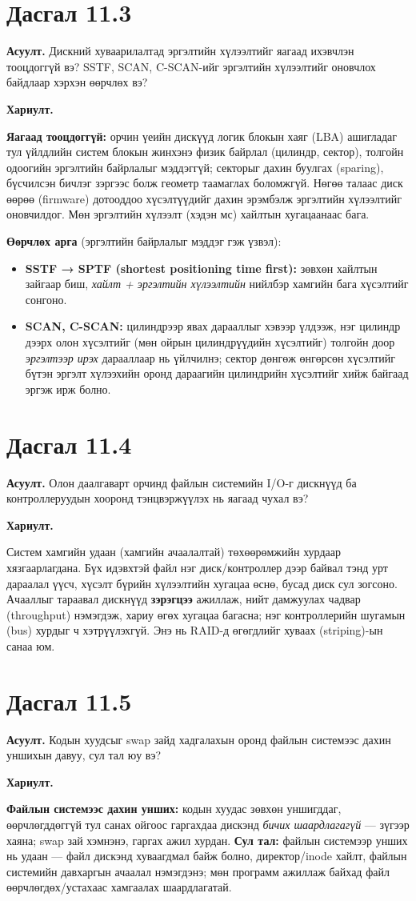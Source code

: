 \documentclass[12pt,a4paper]{article}
\newcommand{\question}[2]{\section{Дасгал #1}\textbf{Асуулт.} #2\par\medskip\textbf{Хариулт.}\par}
\begin{document}
\question{11.3}{Дискний хуваарилалтад эргэлтийн хүлээлтийг яагаад ихэвчлэн тооцдоггүй вэ? SSTF, SCAN, C-SCAN-ийг эргэлтийн хүлээлтийг оновчлох байдлаар хэрхэн өөрчлөх вэ?}

\textbf{Яагаад тооцдоггүй:} орчин үеийн дискүүд логик блокын хаяг (LBA) ашигладаг тул үйлдлийн систем блокын жинхэнэ физик байрлал (цилиндр, сектор), толгойн одоогийн эргэлтийн байрлалыг мэддэггүй; секторыг дахин буулгах (sparing), бүсчилсэн бичлэг зэргээс болж геометр таамаглах боломжгүй. Нөгөө талаас диск өөрөө (firmware) дотооддоо хүсэлтүүдийг дахин эрэмбэлж эргэлтийн хүлээлтийг оновчилдог. Мөн эргэлтийн хүлээлт (хэдэн мс) хайлтын хугацаанаас бага.

\textbf{Өөрчлөх арга} (эргэлтийн байрлалыг мэддэг гэж үзвэл):
\begin{itemize}[leftmargin=1.5em]
  \item \textbf{SSTF → SPTF (shortest positioning time first):} зөвхөн хайлтын зайгаар биш, \emph{хайлт + эргэлтийн хүлээлтийн} нийлбэр хамгийн бага хүсэлтийг сонгоно.
  \item \textbf{SCAN, C-SCAN:} цилиндрээр явах дарааллыг хэвээр үлдээж, нэг цилиндр дээрх олон хүсэлтийг (мөн ойрын цилиндрүүдийн хүсэлтийг) толгойн доор \emph{эргэлтээр ирэх} дарааллаар нь үйлчилнэ; сектор дөнгөж өнгөрсөн хүсэлтийг бүтэн эргэлт хүлээхийн оронд дараагийн цилиндрийн хүсэлтийг хийж байгаад эргэж ирж болно.
\end{itemize}

\question{11.4}{Олон даалгаварт орчинд файлын системийн I/O-г дискнүүд ба контроллеруудын хооронд тэнцвэржүүлэх нь яагаад чухал вэ?}

Систем хамгийн удаан (хамгийн ачаалалтай) төхөөрөмжийн хурдаар хязгаарлагдана. Бүх идэвхтэй файл нэг диск/контроллер дээр байвал тэнд урт дараалал үүсч, хүсэлт бүрийн хүлээлтийн хугацаа өснө, бусад диск сул зогсоно. Ачааллыг тараавал дискнүүд \textbf{зэрэгцээ} ажиллаж, нийт дамжуулах чадвар (throughput) нэмэгдэж, хариу өгөх хугацаа багасна; нэг контроллерийн шугамын (bus) хурдыг ч хэтрүүлэхгүй. Энэ нь RAID-д өгөгдлийг хуваах (striping)-ын санаа юм.

\question{11.5}{Кодын хуудсыг swap зайд хадгалахын оронд файлын системээс дахин уншихын давуу, сул тал юу вэ?}

\textbf{Файлын системээс дахин унших:} кодын хуудас зөвхөн уншигддаг, өөрчлөгддөггүй тул санах ойгоос гаргахдаа дискэнд \emph{бичих шаардлагагүй} — зүгээр хаяна; swap зай хэмнэнэ, гаргах ажил хурдан. \textbf{Сул тал:} файлын системээр унших нь удаан — файл дискэнд хуваагдмал байж болно, директор/inode хайлт, файлын системийн давхаргын ачаалал нэмэгдэнэ; мөн программ ажиллаж байхад файл өөрчлөгдөх/устахаас хамгаалах шаардлагатай.
\end{document}
